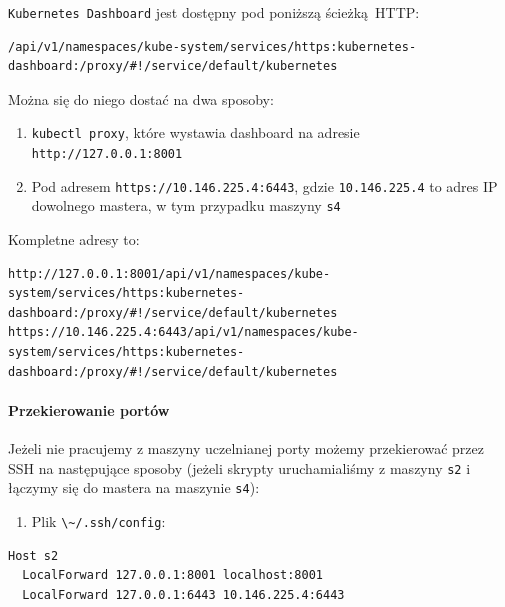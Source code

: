 \documentclass[a4paper,12pt,twoside,openany]{report}
\providecommand{\tightlist}{%
  \setlength{\itemsep}{0pt}\setlength{\parskip}{0pt}}
\newcommand{\passthrough}[1]{#1}
\begin{document}
\passthrough{\lstinline!Kubernetes Dashboard!} jest dostępny pod
poniższą ścieżką~HTTP:

\begin{lstlisting}
/api/v1/namespaces/kube-system/services/https:kubernetes-dashboard:/proxy/#!/service/default/kubernetes
\end{lstlisting}

Można się do niego dostać na dwa sposoby:

\begin{enumerate}
\def\labelenumi{\arabic{enumi}.}
\tightlist
\item
  \passthrough{\lstinline!kubectl proxy!}, które wystawia dashboard na
  adresie \passthrough{\lstinline!http://127.0.0.1:8001!}
\item
  Pod adresem \passthrough{\lstinline!https://10.146.225.4:6443!}, gdzie
  \passthrough{\lstinline!10.146.225.4!} to adres IP dowolnego mastera,
  w tym przypadku maszyny \passthrough{\lstinline!s4!}
\end{enumerate}

Kompletne adresy to:

\begin{lstlisting}
http://127.0.0.1:8001/api/v1/namespaces/kube-system/services/https:kubernetes-dashboard:/proxy/#!/service/default/kubernetes
https://10.146.225.4:6443/api/v1/namespaces/kube-system/services/https:kubernetes-dashboard:/proxy/#!/service/default/kubernetes
\end{lstlisting}

\hypertarget{przekierowanie-portuxf3w}{%
\paragraph{Przekierowanie portów}\label{przekierowanie-portuxf3w}}

Jeżeli nie pracujemy z maszyny uczelnianej porty możemy przekierować
przez SSH na następujące sposoby (jeżeli skrypty uruchamialiśmy z
maszyny \passthrough{\lstinline!s2!} i łączymy się do mastera na
maszynie \passthrough{\lstinline!s4!}):

\begin{enumerate}
\def\labelenumi{\arabic{enumi}.}
\tightlist
\item
  Plik \passthrough{\lstinline!\~/.ssh/config!}:
\end{enumerate}

\begin{lstlisting}
Host s2
  LocalForward 127.0.0.1:8001 localhost:8001
  LocalForward 127.0.0.1:6443 10.146.225.4:6443
\end{lstlisting}
\end{document}
